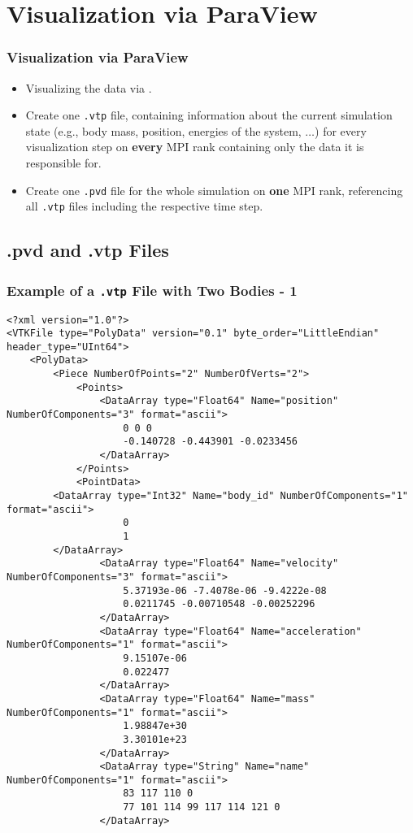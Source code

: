 \section{Visualization via ParaView}
\begin{frame}[fragile]
  \frametitle{Visualization via ParaView}
  \begin{itemize}
      \item Visualizing the data via .
      \item Create one \texttt{.vtp} file, containing information about the current simulation state (e.g., body mass, position, energies of the system, $\dots$) for every visualization step on \textbf{every} MPI rank containing only the data it is responsible for.
      \item Create one \texttt{.pvd} file for the whole simulation on \textbf{one} MPI rank, referencing all \texttt{.vtp} files including the respective time step.
  \end{itemize}
\end{frame}

\subsection{.pvd and .vtp Files}
\begin{frame}[fragile]
  \frametitle{Example of a \texttt{.vtp} File with Two Bodies - 1}
  \setfontsize{5.3pt}
    \begin{verbatim}
<?xml version="1.0"?>
<VTKFile type="PolyData" version="0.1" byte_order="LittleEndian" header_type="UInt64">
	<PolyData>
		<Piece NumberOfPoints="2" NumberOfVerts="2">
			<Points>
				<DataArray type="Float64" Name="position" NumberOfComponents="3" format="ascii">
                    0 0 0
                    -0.140728 -0.443901 -0.0233456
				</DataArray>
			</Points>
			<PointData>
        <DataArray type="Int32" Name="body_id" NumberOfComponents="1" format="ascii">
                    0
                    1
        </DataArray>
				<DataArray type="Float64" Name="velocity" NumberOfComponents="3" format="ascii">
                    5.37193e-06 -7.4078e-06 -9.4222e-08
                    0.0211745 -0.00710548 -0.00252296
				</DataArray>
				<DataArray type="Float64" Name="acceleration" NumberOfComponents="1" format="ascii">
                    9.15107e-06
                    0.022477
				</DataArray>
				<DataArray type="Float64" Name="mass" NumberOfComponents="1" format="ascii">
                    1.98847e+30
                    3.30101e+23
				</DataArray>
				<DataArray type="String" Name="name" NumberOfComponents="1" format="ascii">
                    83 117 110 0
                    77 101 114 99 117 114 121 0
				</DataArray>
  \end{verbatim}
\end{frame}

